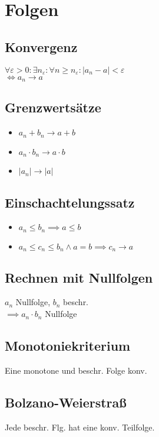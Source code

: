 \section*{Folgen}

\subsection*{Konvergenz}
$\forall \varepsilon>0: \exists n_\varepsilon: \forall n\ge n_\varepsilon: |a_n - a| < \varepsilon$ \\
$\iff a_n \longrightarrow a$

\subsection*{Grenzwertsätze}
\begin{itemize}
	\item $a_n + b_n \longrightarrow a + b$
	\item $a_n \cdot b_n \longrightarrow a \cdot b$
	\item $|a_n| \longrightarrow |a|$
\end{itemize}

\subsection*{Einschachtelungssatz}
\begin{itemize}
	\item $a_n \le b_n \implies a \le b$
	\item $a_n \le c_n \le b_n \land a=b \implies c_n \to a$
\end{itemize}

\subsection*{Rechnen mit Nullfolgen}
$a_n$ Nullfolge, $b_n$ beschr. \\
$\implies a_n\cdot b_n$ Nullfolge

\subsection*{Monotoniekriterium}
Eine monotone und beschr. Folge konv.

\subsection*{Bolzano-Weierstraß}
Jede beschr. Flg. hat eine konv. Teilfolge.

